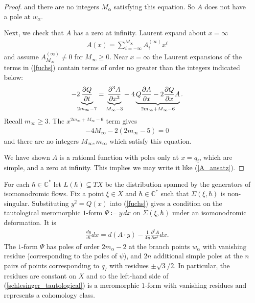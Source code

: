 \documentclass[a4paper,12pt,reqno]{amsart}
\numberwithin{equation}{section}
\numberwithin{counter2}{section}
\begin{document}
\begin{proof}
and there are no integers $M_\alpha$ satisfying this equation.  So $A$ does not have a pole at $w_\alpha$.  \par Next,  we check that $A$ has a zero at infinity.  Laurent expand about $x = \infty$ 
\begin{align}
A(x) = \sum_{i=-\infty}^{M_\infty} A_{i}^{(\infty)} x^{i}
\end{align}
and assume $A_{M_\infty}^{(\infty)} \ne 0$ for $M_\infty \ge 0$. 
Near $x = \infty$ the Laurent expansions of the terms in (\ref{fuchs}) contain terms of order no greater than the integers indicated below:
\begin{align}
-2 \hspace{-2mm}\underbrace{\frac{\partial Q}{\partial t}}_{2m_\infty-7} = \underbrace{\frac{\partial^3 A}{\partial x^3}}_{M_\infty - 3} -  \hspace{1mm} 4\underbrace{Q\frac{\partial A}{\partial x} - 2\frac{\partial Q}{\partial x}A}_{2m_\infty + M_\infty - 6}.  
\end{align}
Recall $m_\infty \ge 3$.  The $x^{2m_\infty + M_\infty - 6}$ term gives 
\begin{align}
-4M_\infty - 2(2m_\infty-5) = 0
\end{align}
and there are no integers $M_\infty,  m_\infty$ which satisfy this equation.  \par 
We have shown $A$ is a rational function with poles only at $x = q_i$,  which are simple,  and a zero at infinity.  This implies we may write it like (\ref{A_ansatz}).  \end{proof} \par 
For each $\hbar \in \mathbb{C}^*$ let $L(\hbar) \subseteq TX$ be the distribution spanned by the generators of isomonodromic flows.  
Fix a point $\xi \in X$ and $\hbar \in \mathbb{C}^*$ such that $\Sigma(\xi,\hbar)$ is non-singular.  Substituting $y^2 = Q(x)$ into (\ref{fuchs}) gives a condition on the tautological meromorphic $1$-form $\Psi \coloneqq y \, dx$ on $\Sigma(\xi,\hbar)$ under an isomonodromic deformation.  It is 
\begin{align}\label{schlesinger_tautological}
\frac{dy}{dt}dx = d(A \cdot y) - \frac{1}{4y}\frac{\partial^3 A}{\partial x^3} dx.
\end{align}
The $1$-form $\Psi$ has poles of order $2m_\alpha-2$ at the branch points $w_\alpha$ with vanishing residue (corresponding to the poles of $\psi$),  and $2n$ additional simple poles at the $n$ pairs of points corresponding to $q_I$ with residues $\pm \sqrt{3}/2$.  In particular,  the residues are constant on $X$ and so the left-hand side of (\ref{schlesinger_tautological}) is a meromorphic $1$-form with vanishing residues and represents a cohomology class.  \par 
\end{document}
